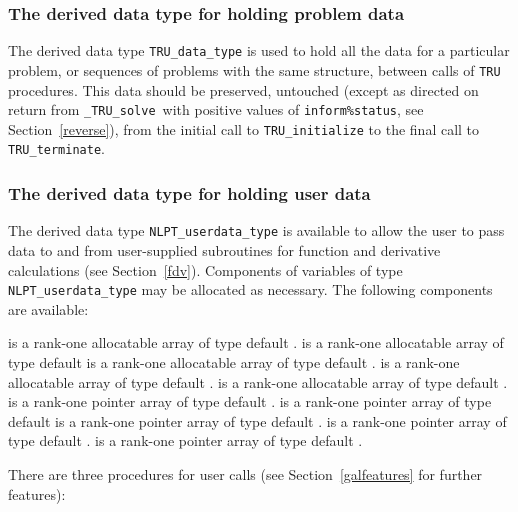 \documentclass{galahad}
\newcommand{\packagename}{TRU}
\newcommand{\fullpackagename}{\libraryname\_\packagename}
\newcommand{\solver}{{\tt \fullpackagename\_solve}}
\begin{document}

\subsubsection{The derived data type for holding problem data}\label{typedata}
The derived data type
{\tt \packagename\_data\_type}
is used to hold all the data for a particular problem,
or sequences of problems with the same structure, between calls of
{\tt \packagename} procedures.
This data should be preserved, untouched (except as directed on
return from \solver\ with positive values of {\tt inform\%status}, see
Section~\ref{reverse}),
from the initial call to
{\tt \packagename\_initialize}
to the final call to
{\tt \packagename\_terminate}.


\subsubsection{The derived data type for holding user data}\label{typeuserdata}
The derived data type
{\tt NLPT\_userdata\_type}
is available to allow the user to pass data to and from user-supplied
subroutines for function and derivative calculations (see Section~\ref{fdv}).
Components of variables of type {\tt NLPT\_userdata\_type} may be allocated as
necessary. The following components are available:

\begin{description}
 is a rank-one allocatable array of type default \integer.
 is a rank-one allocatable array of type default  \realdp
{} is a rank-one allocatable array of type default \complexdp.
 is a rank-one allocatable array of type default \character.
 is a rank-one allocatable array of type default \logical.
 is a rank-one pointer array of type default \integer.
 is a rank-one pointer array of type default  \realdp
{} is a rank-one pointer array of type default \complexdp.
 is a rank-one pointer array of type default \character.
 is a rank-one pointer array of type default \logical.
\end{description}


\galarguments
There are three procedures for user calls
(see Section~\ref{galfeatures} for further features):
\end{document}
